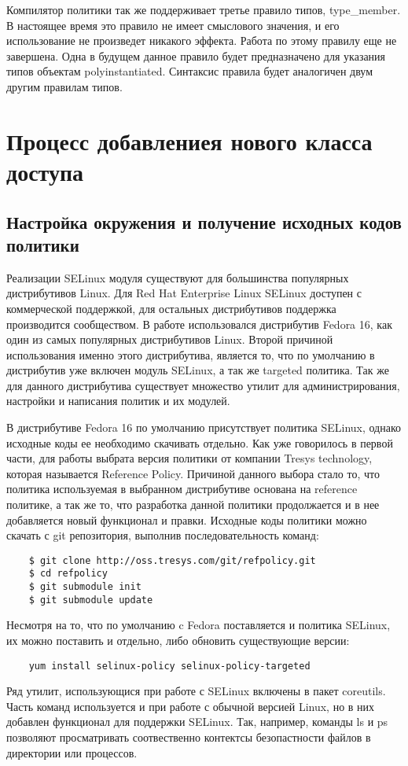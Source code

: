 \documentclass{./../class/UIR}
\begin{document}
Компилятор политики так же поддерживает третье правило типов, type\_member. В
настоящее время это правило не имеет смыслового значения, и его использование не
произведет никакого эффекта. Работа по этому правилу еще не завершена. Одна в
будущем данное правило будет предназначено для указания типов объектам
polyinstantiated. Синтаксис правила будет аналогичен двум другим правилам типов.

    
\section{Процесс добавлениея нового класса доступа} 
	\subsection{Настройка окружения и получение исходных кодов политики}
	Реализации SELinux модуля существуют для большинства популярных дистрибутивов
	Linux. Для Red Hat Enterprise Linux SELinux доступен с коммерческой поддержкой,
	для остальных дистрибутивов поддержка производится сообществом. В работе
	использовался дистрибутив Fedora 16, как один из самых популярных дистрибутивов
	Linux. Второй причиной использования именно этого дистрибутива, является то,
	что по умолчанию в дистрибутив уже включен модуль SELinux, а так же targeted
	политика. Так же для данного дистрибутива существует множество утилит для
	администрирования, настройки и написания политик и их модулей. 
	
	В дистрибутиве Fedora 16 по умолчанию присутствует политика SELinux, однако
	исходные коды ее необходимо скачивать отдельно. Как уже говорилось в первой
	части, для работы выбрата версия политики от компании Tresys technology,
	которая называется Reference Policy. Причиной данного выбора стало то, что
	политика используемая в выбранном дистрибутиве основана на reference политике,
	а так же то, что разработка данной политики продолжается и в нее добавляется
	новый функционал и правки. Исходные коды политики можно скачать с git
	репозитория, выполнив последовательность команд:
	\begin{verbatim}
	$ git clone http://oss.tresys.com/git/refpolicy.git
	$ cd refpolicy
	$ git submodule init
	$ git submodule update
	\end{verbatim}
	Несмотря на то, что по умолчанию c Fedora поставляется и политика SELinux, их
	можно поставить и отдельно, либо обновить существующие версии:
	\begin{verbatim}
	yum install selinux-policy selinux-policy-targeted
	\end{verbatim}
	Ряд утилит, использующися при работе с SELinux включены в пакет coreutils.
	Часть команд используется и при работе с обычной версией Linux, но в них
	добавлен функционал для поддержки SELinux. Так, например, команды ls и ps
	позволяют просматривать соотвественно контектсы безопастности файлов в
	директории или процессов.
	
\end{document}
